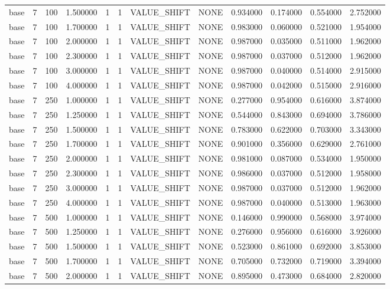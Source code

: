 \begin{tabular}{lrrrllllrrrr}
base & 7 & 100 & 1.500000 & 1 & 1 & VALUE_SHIFT & NONE & 0.934000 & 0.174000 & 0.554000 & 2.752000 \\
base & 7 & 100 & 1.700000 & 1 & 1 & VALUE_SHIFT & NONE & 0.983000 & 0.060000 & 0.521000 & 1.954000 \\
base & 7 & 100 & 2.000000 & 1 & 1 & VALUE_SHIFT & NONE & 0.987000 & 0.035000 & 0.511000 & 1.962000 \\
base & 7 & 100 & 2.300000 & 1 & 1 & VALUE_SHIFT & NONE & 0.987000 & 0.037000 & 0.512000 & 1.962000 \\
base & 7 & 100 & 3.000000 & 1 & 1 & VALUE_SHIFT & NONE & 0.987000 & 0.040000 & 0.514000 & 2.915000 \\
base & 7 & 100 & 4.000000 & 1 & 1 & VALUE_SHIFT & NONE & 0.987000 & 0.042000 & 0.515000 & 2.916000 \\
base & 7 & 250 & 1.000000 & 1 & 1 & VALUE_SHIFT & NONE & 0.277000 & 0.954000 & 0.616000 & 3.874000 \\
base & 7 & 250 & 1.250000 & 1 & 1 & VALUE_SHIFT & NONE & 0.544000 & 0.843000 & 0.694000 & 3.786000 \\
base & 7 & 250 & 1.500000 & 1 & 1 & VALUE_SHIFT & NONE & 0.783000 & 0.622000 & 0.703000 & 3.343000 \\
base & 7 & 250 & 1.700000 & 1 & 1 & VALUE_SHIFT & NONE & 0.901000 & 0.356000 & 0.629000 & 2.761000 \\
base & 7 & 250 & 2.000000 & 1 & 1 & VALUE_SHIFT & NONE & 0.981000 & 0.087000 & 0.534000 & 1.950000 \\
base & 7 & 250 & 2.300000 & 1 & 1 & VALUE_SHIFT & NONE & 0.986000 & 0.037000 & 0.512000 & 1.958000 \\
base & 7 & 250 & 3.000000 & 1 & 1 & VALUE_SHIFT & NONE & 0.987000 & 0.037000 & 0.512000 & 1.962000 \\
base & 7 & 250 & 4.000000 & 1 & 1 & VALUE_SHIFT & NONE & 0.987000 & 0.040000 & 0.513000 & 1.963000 \\
base & 7 & 500 & 1.000000 & 1 & 1 & VALUE_SHIFT & NONE & 0.146000 & 0.990000 & 0.568000 & 3.974000 \\
base & 7 & 500 & 1.250000 & 1 & 1 & VALUE_SHIFT & NONE & 0.276000 & 0.956000 & 0.616000 & 3.926000 \\
base & 7 & 500 & 1.500000 & 1 & 1 & VALUE_SHIFT & NONE & 0.523000 & 0.861000 & 0.692000 & 3.853000 \\
base & 7 & 500 & 1.700000 & 1 & 1 & VALUE_SHIFT & NONE & 0.705000 & 0.732000 & 0.719000 & 3.394000 \\
base & 7 & 500 & 2.000000 & 1 & 1 & VALUE_SHIFT & NONE & 0.895000 & 0.473000 & 0.684000 & 2.820000 \\

\end{tabular}
